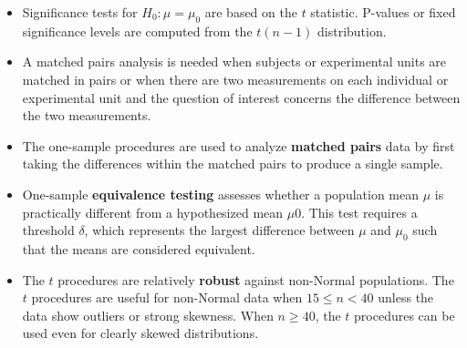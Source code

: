 \begin{itemize}
			\item Significance tests for $H_0: \mu = \mu_0$ are based on the $t$ statistic. P-values or fixed significance levels are computed from the $t(n - 1)$ distribution.
			
			\item A matched pairs analysis is needed when subjects or experimental units are matched in pairs or when there are two measurements on each individual or experimental unit and the question of interest concerns the difference between the two measurements.
			
			\item The one-sample procedures are used to analyze \textbf{matched pairs} data by first taking the differences within the matched pairs to produce a single sample.
			
			\item One-sample \textbf{equivalence testing} assesses whether a population mean $\mu$ is practically different from a hypothesized mean $\mu$0. This test requires a threshold $\delta$, which represents the largest difference between $\mu$ and $\mu_0$ such that the means are considered equivalent.
			
			\item The $t$ procedures are relatively \textbf{robust} against non-Normal populations. The $t$ procedures are useful for non-Normal data when $15\leq n<40$ unless the data show outliers or strong skewness. When $n\geq 40$, the $t$ procedures can be used even for clearly skewed distributions.
		\end{itemize}
